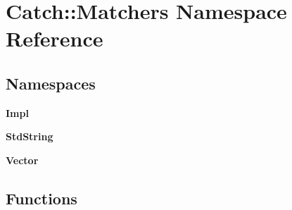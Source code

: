 \section{Catch\+:\+:Matchers Namespace Reference}
\label{namespace_catch_1_1_matchers}
\subsection*{Namespaces}
\begin{DoxyCompactItemize}
\item 
 \textbf{ Impl}
\item 
 \textbf{ Std\+String}
\item 
 \textbf{ Vector}
\end{DoxyCompactItemize}
\subsection*{Functions}
